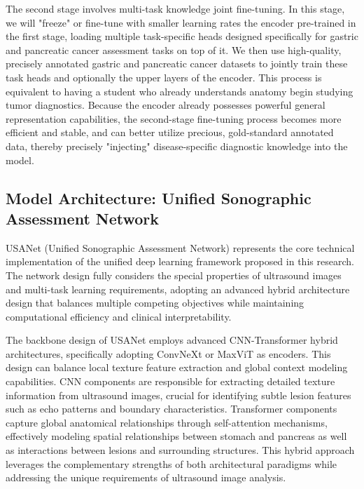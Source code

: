 The second stage involves multi-task knowledge joint fine-tuning. In this stage, we will "freeze" or fine-tune with smaller learning rates the encoder pre-trained in the first stage, loading multiple task-specific heads designed specifically for gastric and pancreatic cancer assessment tasks on top of it. We then use high-quality, precisely annotated gastric and pancreatic cancer datasets to jointly train these task heads and optionally the upper layers of the encoder. This process is equivalent to having a student who already understands anatomy begin studying tumor diagnostics. Because the encoder already possesses powerful general representation capabilities, the second-stage fine-tuning process becomes more efficient and stable, and can better utilize precious, gold-standard annotated data, thereby precisely "injecting" disease-specific diagnostic knowledge into the model.

\subsection{Model Architecture: Unified Sonographic Assessment Network}

USANet (Unified Sonographic Assessment Network) represents the core technical implementation of the unified deep learning framework proposed in this research. The network design fully considers the special properties of ultrasound images and multi-task learning requirements, adopting an advanced hybrid architecture design that balances multiple competing objectives while maintaining computational efficiency and clinical interpretability.

The backbone design of USANet employs advanced CNN-Transformer hybrid architectures, specifically adopting ConvNeXt or MaxViT as encoders. This design can balance local texture feature extraction and global context modeling capabilities. CNN components are responsible for extracting detailed texture information from ultrasound images, crucial for identifying subtle lesion features such as echo patterns and boundary characteristics. Transformer components capture global anatomical relationships through self-attention mechanisms, effectively modeling spatial relationships between stomach and pancreas as well as interactions between lesions and surrounding structures. This hybrid approach leverages the complementary strengths of both architectural paradigms while addressing the unique requirements of ultrasound image analysis.

